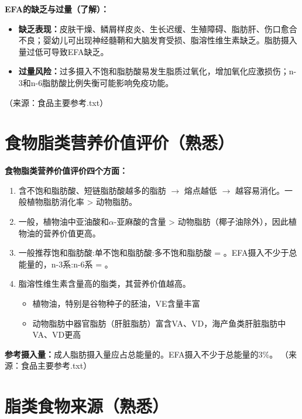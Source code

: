 \begin{tipbox}
\textbf{EFA的缺乏与过量（了解）：}
\begin{itemize}[leftmargin=*]
    \item \textbf{缺乏表现：}皮肤干燥、鳞屑样皮炎、生长迟缓、生殖障碍、脂肪肝、伤口愈合不良；婴幼儿可出现神经髓鞘和大脑发育受损、脂溶性维生素缺乏。脂肪摄入量过低可导致EFA缺乏。
    \item \textbf{过量风险：}过多摄入不饱和脂肪酸易发生脂质过氧化，增加氧化应激损伤；n-3和n-6脂肪酸比例失衡可能影响免疫功能。
\end{itemize}
（来源：食品主要参考.txt）
\end{tipbox}

\section{食物脂类营养价值评价（熟悉）}

\begin{tipbox}
\textbf{食物脂类营养价值评价四个方面：}
\begin{enumerate}[leftmargin=*]
    \item {}含不饱和脂肪酸、短链脂肪酸越多的脂肪 $\rightarrow$ 熔点越低 $\rightarrow$ 越容易消化。一般植物脂肪消化率 > 动物脂肪。

    \item {}一般，植物油中亚油酸和$\alpha$-亚麻酸的含量 > 动物脂肪（椰子油除外），因此植物油的营养价值更高。

    \item {}一般推荐饱和脂肪酸:单不饱和脂肪酸:多不饱和脂肪酸 = 。EFA摄入不少于总能量的，n-3系:n-6系 = 。

    \item {}脂溶性维生素含量高的脂类，其营养价值越高。
    \begin{itemize}
        \item 植物油，特别是谷物种子的胚油，VE含量丰富
        \item 动物脂肪中器官脂肪（肝脏脂肪）富含VA、VD，海产鱼类肝脏脂肪中VA、VD更高
    \end{itemize}
\end{enumerate}

\textbf{参考摄入量：}成人脂肪摄入量应占总能量的。EFA摄入不少于总能量的3\%。
（来源：食品主要参考.txt）
\end{tipbox}

\section{脂类食物来源（熟悉）}

